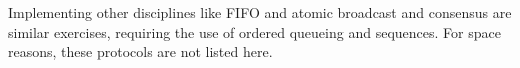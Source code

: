 Implementing other disciplines like FIFO and atomic broadcast and consensus are similar exercises, requiring the use of
ordered queueing and sequences.  For space reasons, these protocols are not listed here.
